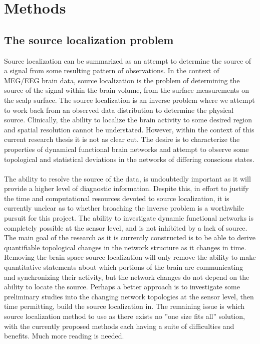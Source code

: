 \documentclass{article}
\begin{document}
\section{Methods}

\subsection{The source localization problem}
Source localization can be summarized as an attempt to determine the source of a signal from some resulting pattern of observations. In the context of MEG/EEG brain data, source localization is the problem of determining the source of the signal within the brain volume, from the surface measurements on the scalp surface. The source localization is an inverse problem where we attempt to work back from an observed data distribution to determine the physical source. Clinically, the ability to localize the brain activity to some desired region and spatial resolution cannot be understated. However, within the context of this current research thesis it is not as clear cut. The desire is to characterize the properties of dynamical functional brain networks and attempt to observe some topological and statistical deviations in the networks of differing conscious states.\\ 
\\
The ability to resolve the source of the data, is undoubtedly important as it will provide a higher level of diagnostic information. Despite this, in effort to justify the time and computational resources devoted to source localization, it is currently unclear as to whether broaching the inverse problem is a worthwhile pursuit for this project. The ability to investigate dynamic functional networks is completely possible at the sensor level, and is not inhibited by a lack of source. The main goal of the research as it is currently constructed is to be able to derive quantifiable topological changes in the network structure as it changes in time. Removing the brain space source localization will only remove the ability to make quantitative statements about which portions of the brain are communicating and synchronizing their activity, but the network changes do not depend on the ability to locate the source. Perhaps a better approach is to investigate some preliminary studies into the changing network topologies at the sensor level, then time permitting, build the source localization in. The remaining issue is which source localization method to use as there exists no ''one size fits all'' solution, with the currently proposed methods each having a suite of difficulties and benefits. Much more reading is needed. 
\end{document}
